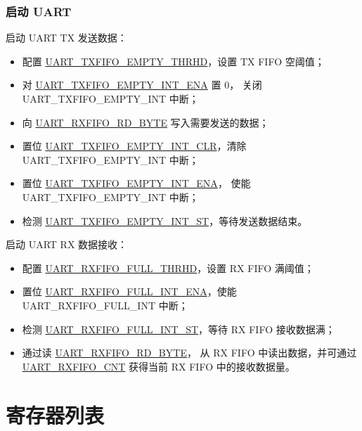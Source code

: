 \documentclass[main\_\_CN.tex]{subfiles}
\begin{document}
\subsubsection{启动 UART}
启动 UART TX 发送数据：
\begin{itemize}
    \item 配置 \hyperref[fielddesc:UARTTXFIFOEMPTYTHRHD]{UART\_TXFIFO\_EMPTY\_THRHD}，设置 TX FIFO 空阈值；
    \item 对 \hyperref[fielddesc:UARTTXFIFOEMPTYINTENA]{UART\_TXFIFO\_EMPTY\_INT\_ENA} 置 0， 关闭 UART\_TXFIFO\_EMPTY\_INT 中断；
    \item 向 \hyperref[fielddesc:UARTRXFIFORDBYTE]{UART\_RXFIFO\_RD\_BYTE} 写入需要发送的数据；
    \item 置位 \hyperref[fielddesc:UARTTXFIFOEMPTYINTCLR]{UART\_TXFIFO\_EMPTY\_INT\_CLR}，清除 UART\_TXFIFO\_EMPTY\_INT 中断；
    \item 置位 \hyperref[fielddesc:UARTTXFIFOEMPTYINTENA]{UART\_TXFIFO\_EMPTY\_INT\_ENA}， 使能 UART\_TXFIFO\_EMPTY\_INT 中断；
    \item 检测 \hyperref[fielddesc:UARTTXFIFOEMPTYINTST]{UART\_TXFIFO\_EMPTY\_INT\_ST}，等待发送数据结束。
\end{itemize}

启动 UART RX 数据接收：
\begin{itemize}
    \item 配置 \hyperref[fielddesc:UARTRXFIFOFULLTHRHD]{UART\_RXFIFO\_FULL\_THRHD}，设置 RX FIFO 满阈值；
    \item 置位 \hyperref[fielddesc:UARTRXFIFOFULLINTENA]{UART\_RXFIFO\_FULL\_INT\_ENA}，使能 UART\_RXFIFO\_FULL\_INT 中断；
    \item 检测 \hyperref[fielddesc:UARTRXFIFOFULLINTST]{UART\_RXFIFO\_FULL\_INT\_ST}，等待 RX FIFO 接收数据满；
    \item 通过读 \hyperref[fielddesc:UARTRXFIFORDBYTE]{UART\_RXFIFO\_RD\_BYTE}， 从 RX FIFO 中读出数据，并可通过 \hyperref[fielddesc:UARTRXFIFOCNT]{UART\_RXFIFO\_CNT} 获得当前 RX FIFO 中的接收数据量。
\end{itemize}



\clearpage
\section{寄存器列表}
\label{sec:uart-reg-summ}
\hypertarget{uart-reg-summ}{}
\end{document}

